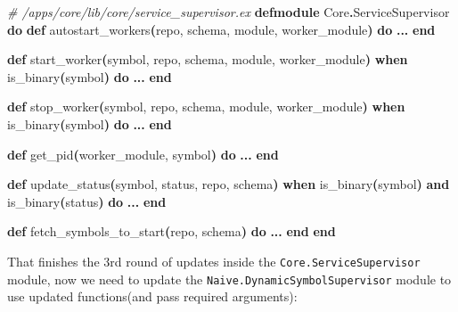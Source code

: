 \documentclass[
  oneside]{book}
\newenvironment{Shaded}{\begin{snugshade}}{\end{snugshade}}
\newcommand{\CommentTok}[1]{\textcolor[rgb]{0.56,0.35,0.01}{\textit{#1}}}
\newcommand{\ConstantTok}[1]{\textcolor[rgb]{0.56,0.35,0.01}{#1}}
\newcommand{\FunctionTok}[1]{\textcolor[rgb]{0.13,0.29,0.53}{\textbf{#1}}}
\newcommand{\KeywordTok}[1]{\textcolor[rgb]{0.13,0.29,0.53}{\textbf{#1}}}
\newcommand{\NormalTok}[1]{#1}
\newcommand{\OperatorTok}[1]{\textcolor[rgb]{0.81,0.36,0.00}{\textbf{#1}}}
\begin{document}
\begin{Shaded}
\begin{Highlighting}[]
  \CommentTok{\# /apps/core/lib/core/service\_supervisor.ex}
\KeywordTok{defmodule} \ConstantTok{Core}\OperatorTok{.}\ConstantTok{ServiceSupervisor} \KeywordTok{do}
  \KeywordTok{def}\NormalTok{ autostart\_workers}\FunctionTok{(}\NormalTok{repo, schema, module, worker\_module}\FunctionTok{)} \KeywordTok{do}
    \OperatorTok{...}
  \KeywordTok{end}

  \KeywordTok{def}\NormalTok{ start\_worker}\FunctionTok{(}\NormalTok{symbol, repo, schema, module, worker\_module}\FunctionTok{)}
      \KeywordTok{when}\NormalTok{ is\_binary}\FunctionTok{(}\NormalTok{symbol}\FunctionTok{)} \KeywordTok{do}
    \OperatorTok{...}
  \KeywordTok{end}

  \KeywordTok{def}\NormalTok{ stop\_worker}\FunctionTok{(}\NormalTok{symbol, repo, schema, module, worker\_module}\FunctionTok{)}
      \KeywordTok{when}\NormalTok{ is\_binary}\FunctionTok{(}\NormalTok{symbol}\FunctionTok{)} \KeywordTok{do}
    \OperatorTok{...}
  \KeywordTok{end}

  \KeywordTok{def}\NormalTok{ get\_pid}\FunctionTok{(}\NormalTok{worker\_module, symbol}\FunctionTok{)} \KeywordTok{do}
    \OperatorTok{...}
  \KeywordTok{end}

  \KeywordTok{def}\NormalTok{ update\_status}\FunctionTok{(}\NormalTok{symbol, status, repo, schema}\FunctionTok{)}
      \KeywordTok{when}\NormalTok{ is\_binary}\FunctionTok{(}\NormalTok{symbol}\FunctionTok{)} \KeywordTok{and}\NormalTok{ is\_binary}\FunctionTok{(}\NormalTok{status}\FunctionTok{)} \KeywordTok{do}
    \OperatorTok{...}
  \KeywordTok{end}

  \KeywordTok{def}\NormalTok{ fetch\_symbols\_to\_start}\FunctionTok{(}\NormalTok{repo, schema}\FunctionTok{)} \KeywordTok{do}
    \OperatorTok{...}
  \KeywordTok{end}
\KeywordTok{end}
\end{Highlighting}
\end{Shaded}

That finishes the 3rd round of updates inside the \texttt{Core.ServiceSupervisor} module, now we need to update the \texttt{Naive.DynamicSymbolSupervisor} module to use updated functions(and pass required arguments):
\end{document}
